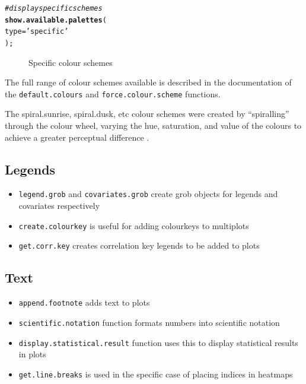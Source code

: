 \documentclass[letterpaper]{report}\usepackage[]{graphicx}\usepackage[]{color}
\makeatletter
\newcommand{\hlstr}[1]{\textcolor[rgb]{0.192,0.494,0.8}{#1}}%
\newcommand{\hlcom}[1]{\textcolor[rgb]{0.678,0.584,0.686}{\textit{#1}}}%
\newcommand{\hlstd}[1]{\textcolor[rgb]{0.345,0.345,0.345}{#1}}%
\newcommand{\hlkwc}[1]{\textcolor[rgb]{0.333,0.667,0.333}{#1}}%
\newcommand{\hlkwd}[1]{\textcolor[rgb]{0.737,0.353,0.396}{\textbf{#1}}}%
\newenvironment{kframe}{%
 \def\at@end@of@kframe{}%
 \ifinner\ifhmode%
  \def\at@end@of@kframe{\end{minipage}}%
  \begin{minipage}{\columnwidth}%
 \fi\fi%
 \def\FrameCommand##1{\hskip\@totalleftmargin \hskip-\fboxsep
 \colorbox{shadecolor}{##1}\hskip-\fboxsep
     \hskip-\linewidth \hskip-\@totalleftmargin \hskip\columnwidth}%
 \MakeFramed {\advance\hsize-\width
   \@totalleftmargin\z@ \linewidth\hsize
   \@setminipage}}%
 {\par\unskip\endMakeFramed%
 \at@end@of@kframe}
\newenvironment{knitrout}{}{} %
\makeatother
\begin{document}
\begin{knitrout}
\color{fgcolor}\begin{kframe}
\begin{alltt}
\hlcom{# display specific schemes}
\hlkwd{show.available.palettes}\hlstd{(}
    \hlkwc{type} \hlstd{=} \hlstr{'specific'}
    \hlstd{);}
\end{alltt}
\end{kframe}\begin{figure}

{\centering {} 

}

\caption[Specific colour schemes]{Specific colour schemes\label{fig:colour_scheme_specific}}
\end{figure}


\end{knitrout}

The full range of colour schemes available is described in the documentation of the \verb|default.colours| and \verb|force.colour.scheme| functions.

The spiral.sunrise, spiral.dusk, etc colour schemes were created by ``spiralling'' through the colour wheel, varying the hue, saturation, and value of the colours to achieve a greater perceptual difference \cite{rainbow, wong2}. 

\subsection{Legends}
\begin{itemize}
\item \texttt{legend.grob} and \texttt{covariates.grob} create grob objects for legends and covariates respectively
\item \texttt{create.colourkey} is useful for adding colourkeys to multiplots
\item \texttt{get.corr.key} creates correlation key legends to be added to plots
\end{itemize}

\subsection{Text}
\begin{itemize}
\item \texttt{append.footnote} adds text to plots
\item \texttt{scientific.notation} function formats numbers into scientific notation
\item \texttt{display.statistical.result} function uses this to display statistical results in plots
\item \texttt{get.line.breaks} is used in the specific case of placing indices in heatmaps
\end{itemize}
\end{document}
